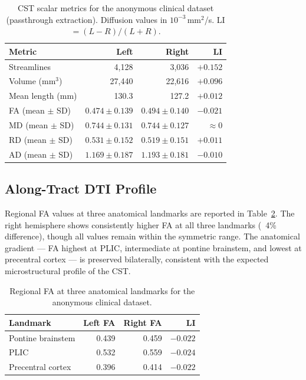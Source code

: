 \begin{table}[h]
    \centering
    \caption{CST scalar metrics for the anonymous clinical dataset (passthrough extraction).
             Diffusion values in $10^{-3}$\,mm$^2$/s. LI $= (L-R)/(L+R)$.}
    \label{tab:clinical-metrics}
    \begin{tabular}{lrrr}
        \hline
        Metric & Left & Right & LI \\
        \hline
        Streamlines          & 4,128  & 3,036  & $+0.152$ \\
        Volume (mm$^3$)      & 27,440 & 22,616 & $+0.096$ \\
        Mean length (mm)     & 130.3  & 127.2  & $+0.012$ \\
        FA (mean $\pm$ SD)   & $0.474 \pm 0.139$ & $0.494 \pm 0.140$ & $-0.021$ \\
        MD (mean $\pm$ SD)   & $0.744 \pm 0.131$ & $0.744 \pm 0.127$ & $\approx 0$ \\
        RD (mean $\pm$ SD)   & $0.531 \pm 0.152$ & $0.519 \pm 0.151$ & $+0.011$ \\
        AD (mean $\pm$ SD)   & $1.169 \pm 0.187$ & $1.193 \pm 0.181$ & $-0.010$ \\
        \hline
    \end{tabular}
\end{table}

\subsection{Along-Tract DTI Profile}
\label{subsec:clinical-profile}

Regional FA values at three anatomical landmarks are reported in Table~\ref{tab:clinical-landmarks}. The right hemisphere shows consistently higher FA at all three landmarks (~4\% difference), though all values remain within the symmetric range. The anatomical gradient — FA highest at PLIC, intermediate at pontine brainstem, and lowest at precentral cortex — is preserved bilaterally, consistent with the expected microstructural profile of the CST.

\begin{table}[h]
    \centering
    \caption{Regional FA at three anatomical landmarks for the anonymous clinical dataset.}
    \label{tab:clinical-landmarks}
    \begin{tabular}{lrrr}
        \hline
        Landmark & Left FA & Right FA & LI \\
        \hline
        Pontine brainstem & 0.439 & 0.459 & $-0.022$ \\
        PLIC              & 0.532 & 0.559 & $-0.024$ \\
        Precentral cortex & 0.396 & 0.414 & $-0.022$ \\
        \hline
    \end{tabular}
\end{table}

